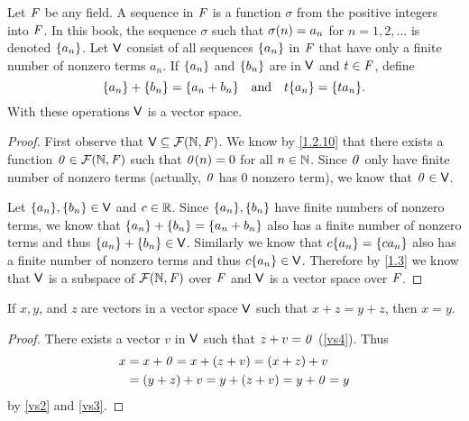 \begin{eg}\label{1.2.13}
  Let \(\mathit{F}\) be any field.
  A sequence in \(\mathit{F}\) is a function \(\sigma\) from the positive integers into \(\mathit{F}\).
  In this book, the sequence \(\sigma\) such that \(\sigma\p{n} = a_{n}\) for \(n = 1, 2, \dots\) is denoted \(\left\lbrace a_{n}\right\rbrace\).
  Let \(\mathsf{V}\) consist of all sequences \(\left\lbrace a_{n}\right\rbrace\) in \(\mathit{F}\) that have only a finite number of nonzero terms \(a_{n}\).
  If \(\left\lbrace a_{n}\right\rbrace\) and \(\left\lbrace b_{n}\right\rbrace\) are in \(\mathsf{V}\) and \(t \in \mathit{F}\), define
  \[
    \set{a_{n}} + \set{b_{n}} = \set{a_{n} + b_{n}} \quad \text{and} \quad t\set{a_{n}} = \set{ta_{n}}.
  \]
  With these operations \(\mathsf{V}\) is a vector space.
\end{eg}

\begin{proof}
  First observe that \(\V \subseteq \fs{\N}{\F}\).
  We know by \cref{1.2.10} that there exists a function \(\zv \in \fs{\N}{\F}\) such that \(\mathit{0}(n) = 0\) for all \(n \in \mathbb{N}\).
  Since \(\mathit{0}\) only have finite number of nonzero terms (actually, \(\mathit{0}\) has \(0\) nonzero term), we know that \(\mathit{0} \in \mathsf{V}\).

  Let \(\B{a_{n}}, \B{b_{n}} \in \V\) and \(c \in \mathbb{R}\).
  Since \(\B{a_{n}}, \B{b_{n}}\) have finite numbers of nonzero terms, we know that \(\left\lbrace a_{n}\right\rbrace + \left\lbrace b_{n}\right\rbrace = \left\lbrace a_{n} + b_{n}\right\rbrace\) also has a finite number of nonzero terms and thus \(\left\lbrace a_{n}\right\rbrace + \left\lbrace b_{n}\right\rbrace \in \mathsf{V}\).
  Similarly we know that \(c\B{a_{n}} = \B{ca_{n}}\) also has a finite number of nonzero terms and thus \(c\B{a_{n}} \in \V\).
  Therefore by \cref{1.3} we know that \(\mathsf{V}\) is a subspace of \(\fs{\N}{\F}\) over \(\mathit{F}\) and \(\mathsf{V}\) is a vector space over \(\mathit{F}\).
\end{proof}

\begin{thm}\label{1.1}
  If \(x, y\), and \(z\) are vectors in a vector space \(\mathsf{V}\) such that \(x + z = y + z\), then \(x = y\).
\end{thm}

\begin{proof}
  There exists a vector \(v\) in \(\mathsf{V}\) such that \(z + v = \mathit{0}\) (\ref{vs4}).
  Thus
  \begin{align*}
    x & = x + \mathit{0} = x + \left\lparen z + v\right\rparen = \left\lparen x + z\right\rparen + v     \\
      & = \left\lparen y + z\right\rparen + v = y + \left\lparen z + v\right\rparen = y + \mathit{0} = y
  \end{align*}
  by \ref{vs2} and \ref{vs3}.
\end{proof}

